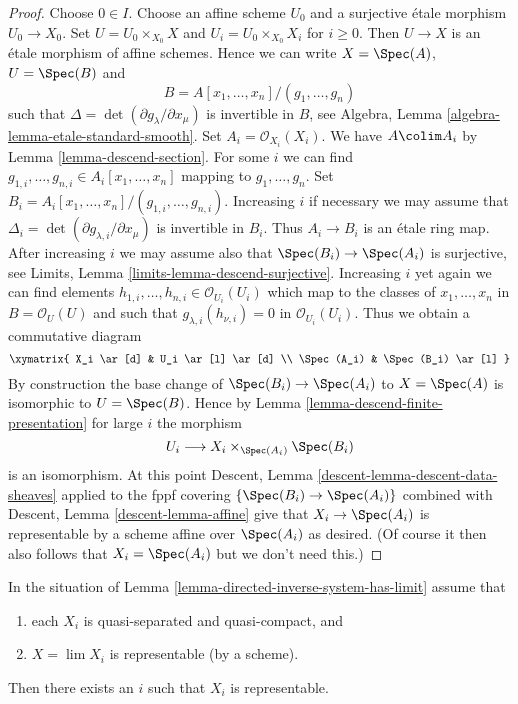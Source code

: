 \begin{proof}
Choose $0 \in I$. Choose an affine scheme $U_0$ and a surjective
\'etale morphism $U_0 \to X_0$. Set $U = U_0 \times_{X_0} X$
and $U_i = U_0 \times_{X_0} X_i$ for $i \geq 0$.
Then $U \to X$ is an \'etale morphism of affine schemes. Hence we
can write $X = \Spec(A)$, $U = \Spec(B)$ and
$$
B = A[x_1, \ldots, x_n]/(g_1, \ldots, g_n)
$$
such that $\Delta = \det(\partial g_\lambda/\partial x_\mu)$ is invertible
in $B$, see Algebra, Lemma \ref{algebra-lemma-etale-standard-smooth}.
Set $A_i = \mathcal{O}_{X_i}(X_i)$. We have $A \colim A_i$ by
Lemma \ref{lemma-descend-section}. For some $i$ we can find
$g_{1, i}, \ldots, g_{n, i} \in A_i[x_1, \ldots, x_n]$ mapping to
$g_1, \ldots, g_n$. Set
$B_i = A_i[x_1, \ldots, x_n]/(g_{1, i}, \ldots, g_{n, i})$.
Increasing $i$ if necessary we may assume that
$\Delta_i = \det(\partial g_{\lambda, i}/\partial x_\mu)$ is invertible
in $B_i$. Thus $A_i \to B_i$ is an \'etale ring map.
After increasing $i$ we may assume also that
$\Spec(B_i) \to \Spec(A_i)$ is surjective, see
Limits, Lemma \ref{limits-lemma-descend-surjective}. Increasing
$i$ yet again we can find elements
$h_{1, i}, \ldots, h_{n, i} \in \mathcal{O}_{U_i}(U_i)$ which map to the
classes of $x_1, \ldots, x_n$ in $B = \mathcal{O}_U(U)$ and such that
$g_{\lambda, i}(h_{\nu, i}) = 0$ in $\mathcal{O}_{U_i}(U_i)$. Thus
we obtain a commutative diagram
$$
\xymatrix{
X_i \ar[d] & U_i \ar[l] \ar[d] \\
\Spec(A_i) & \Spec(B_i) \ar[l]
}
$$
By construction the base change of $\Spec(B_i) \to \Spec(A_i)$ to
$X = \Spec(A)$ is isomorphic to $U = \Spec(B)$. Hence by
Lemma \ref{lemma-descend-finite-presentation}
for large $i$ the morphism
$$
U_i \longrightarrow X_i \times_{\Spec(A_i)} \Spec(B_i)
$$
is an isomorphism. At this point
Descent, Lemma \ref{descent-lemma-descent-data-sheaves}
applied to the fppf covering $\{\Spec(B_i) \to \Spec(A_i)\}$
combined with Descent, Lemma \ref{descent-lemma-affine}
give that $X_i \to \Spec(A_i)$ is representable by a scheme
affine over $\Spec(A_i)$ as desired. (Of course it then also follows
that $X_i = \Spec(A_i)$ but we don't need this.)
\end{proof}

\begin{lemma}
\label{lemma-limit-is-scheme}
In the situation of Lemma \ref{lemma-directed-inverse-system-has-limit}
assume that
\begin{enumerate}
\item each $X_i$ is quasi-separated and quasi-compact, and
\item $X = \lim X_i$ is representable (by a scheme).
\end{enumerate}
Then there exists an $i$ such that $X_i$ is representable.
\end{lemma}

